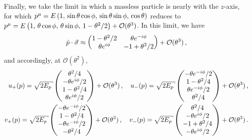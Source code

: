 \begin{subappendices}
\begin{example}
    \label{ex:collinear-bispinor}
    Finally, we take the limit in which a massless particle is nearly  with the \(z\)-axis, for which
    \(
        p^\mu
        =
        E \left(1, \, \sin\theta \cos\phi, \, \sin\theta \sin\phi, \, \cos\theta\right)
    \)
    reduces to
    \(
        p^\mu
        =
        E \left(1, \, \theta \cos\phi, \, \theta\sin\phi, \, 1 - \theta^2/2\right)
        +
        \mathcal{O}(\theta^3)
    \).
    In this limit, we have
    \begin{align}
        \hat{p}\cdot\vec{\sigma}
        \approx
        \begin{pmatrix}1 - \theta^2/2& \theta e^{-i\phi} \\ \theta e^{i\phi} & -1+\theta^2/2\end{pmatrix}
        +
        \mathcal{O}(\theta^3)
        \,,
    \end{align}
    and accordingly, at \(\mathcal{O}(\theta^2)\),
    \begin{align}
        \label{eq:bispinor-u-collinear}
        u_+(p)
        =
        \sqrt{2 E_p}
        \pmtrx{\theta^2/4 \\ -\theta e^{i\phi}/2 \\ 1-\theta^2/4 \\ \theta e^{i\phi}/2}
        +
        \mathcal{O}(\theta^3)
        \,,
        \quad
        u_-(p)
        =
        \sqrt{2 E_p}
        \pmtrx{-\theta e^{-i\phi}/2 \\ 1 - \theta^2/4\\ \theta e^{-i\phi}/2 \\  \theta^2/4}
        +
        \mathcal{O}(\theta^3)
        \,,
        \\
        \label{eq:bispinor-v-collinear}
        v_+(p)
        =
        \sqrt{2 E_p}
        \pmtrx{-\theta e^{-i\phi}/2 \\ 1 - \theta^2/4\\ -\theta e^{-i\phi}/2 \\ -\theta^2/4}
        +
        \mathcal{O}(\theta^3)
        \,,
        \quad
        v_-(p)
        =
        \sqrt{2 E_p}
        \pmtrx{\theta^2/4\\ -\theta e^{i\phi}/2 \\ -1+\theta^2/4 \\ -\theta e^{i\phi}/2}
        +
        \mathcal{O}(\theta^3)
        \,.
    \end{align}
\end{example}



\end{subappendices}
